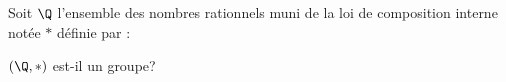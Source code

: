 Soit $\Q$ l'ensemble des nombres rationnels muni de la loi de composition interne notée $\ast$ définie par :


$(\Q, \ast)$ est-il un groupe?